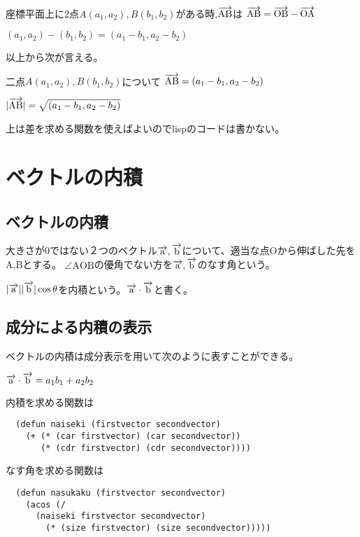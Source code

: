 \documentclass[a4paper]{jsarticle}
\newcommand{\abs}[1]{\lvert #1 \rvert}
\newcommand{\bekutoru}[1]{\overrightarrow{\rm #1}}
\begin{document}
座標平面上に2点$A(a_1, a_2),B(b_1, b_2)$がある時,$\bekutoru{AB}$は
$\bekutoru{AB}=\bekutoru{OB}-\bekutoru{OA}$\par
$(a_1, a_2)-(b_1, b_2)=(a_1-b_1, a_2-b_2)$\par

以上から次が言える。
\begin{screen}
  二点$A(a_1, a_2),B(b_1, b_2)$について
  $\bekutoru{AB}=(a_1-b_1, a_2-b_2)$\par
  $\abs{\bekutoru{AB}}=\sqrt{(a_1-b_1, a_2-b_2)}$\par
\end{screen}

上は差を求める関数を使えばよいのでlispのコードは書かない。\par

\section*{ベクトルの内積}
\subsection*{ベクトルの内積}

大きさが0ではない２つのベクトル$\bekutoru{a},\bekutoru{b}$について、適当な点Oから伸ばした先をA,Bとする。
$\angle\mathrm{AOB}$の優角でない方を$\bekutoru{a},\bekutoru{b}$のなす角という。\par
$\abs{\bekutoru{a}}\abs{\bekutoru{b}}\cos\theta$を内積という。$\bekutoru{a}\cdot\bekutoru{b}$と書く。

\subsection*{成分による内積の表示}
ベクトルの内積は成分表示を用いて次のように表すことができる。

\begin{screen}
  $\bekutoru{a}\cdot\bekutoru{b}=a_1b_1+a_2b_2$
\end{screen}

\begin{boxnote}
  内積を求める関数は
  \begin{lstlisting}
  (defun naiseki (firstvector secondvector)
    (+ (* (car firstvector) (car secondvector))
       (* (cdr firstvector) (cdr secondvector))))
  \end{lstlisting}
  なす角を求める関数は
  \begin{lstlisting}
  (defun nasukaku (firstvector secondvector)
    (acos (/
      (naiseki firstvector secondvector)
        (* (size firstvector) (size secondvector)))))
  \end{lstlisting}
\end{boxnote}
\end{document}
